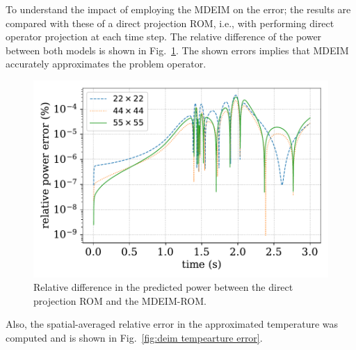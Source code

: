 \documentclass[]{interact}
\theoremstyle{plain}%
\theoremstyle{definition}
\theoremstyle{remark}
\begin{document}
To understand the impact of employing the MDEIM on the error; the results are compared with these of a direct projection ROM, i.e., with performing direct operator projection at each time step.
The relative difference of the power between both models is shown in Fig.~\ref{fig:rom-deim power error}.
The shown errors implies that MDEIM accurately approximates the problem operator.

\begin{figure}[H]
	\centering
	\includegraphics[width=1.0\linewidth]{../figures/LRA_mdeim_relative_error.pdf}
	\caption{Relative difference in the predicted power between the direct projection ROM and the MDEIM-ROM.}
	\label{fig:rom-deim power error}
\end{figure}
Also, the spatial-averaged relative error in the approximated temperature was computed and is shown in Fig.~\ref{fig:deim tempearture error}.
\end{document}

